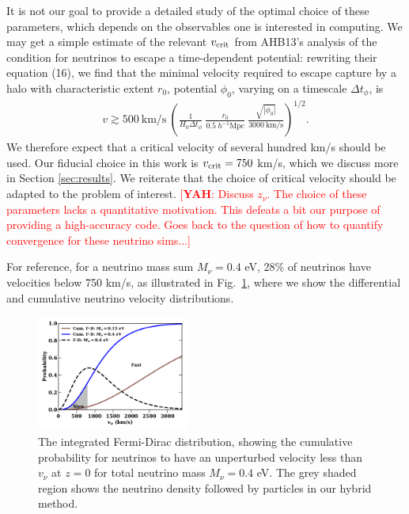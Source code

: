 \documentclass[useAMS, usenatbib]{mnras}
\newcommand{\barr}{\begin{eqnarray}}
\newcommand{\earr}{\end{eqnarray}}
\newcommand{\yah}[1]{{\textcolor{red}{[{\bf YAH}: #1]}}}
\begin{document}
It is not our goal to provide a detailed study of the optimal choice of these parameters, which depends on the observables one is interested in computing. We may get a simple estimate of the relevant $v_{\rm crit}$ from AHB13's analysis of the condition for neutrinos to escape a time-dependent potential: rewriting their equation (16), we find that the minimal velocity required to escape capture by a halo with characteristic extent $r_0$, potential $\phi_0$, varying on a timescale $\Delta t_\phi$, is
\barr
v \gtrsim 500 ~\textrm{km/s} ~ \left(\frac1{H_0 \Delta t_\phi} ~ \frac{r_0}{0.5~ h^{-1} \textrm{Mpc}}~ \frac{\sqrt{|\phi_0|}}{3000~ \textrm{km/s}} \right)^{1/2}.
\earr
We therefore expect that a critical velocity of several hundred km/s should be used. Our fiducial choice in this work is $v_{\rm crit} = 750$ km/s, which we discuss more in Section \ref{sec:results}. We reiterate that the choice of critical velocity should be adapted to the problem of interest. 
\yah{Discuss $z_\nu$. The choice of these parameters lacks a quantitative motivation. This defeats a bit our purpose of providing a high-accuracy code. Goes back to the question of how to quantify convergence for these neutrino sims...}

For reference, for a neutrino mass sum $M_\nu = 0.4$ eV, 28\% of neutrinos have velocities below 750 km/s, as illustrated in Fig.~\ref{fig:fddistribution}, where we show the differential and cumulative neutrino velocity distributions. 

\begin{figure}
\includegraphics[width=0.45\textwidth]{nuplots/fermidirac.pdf}
  \caption{The integrated Fermi-Dirac distribution, showing the cumulative probability for neutrinos to have an unperturbed velocity less than $v_\nu$ at $z=0$ for total neutrino mass $M_\nu = 0.4$ eV.
  The grey shaded region shows the neutrino density followed by particles in our hybrid method.
  }
  \label{fig:fddistribution}
\end{figure}
\end{document}
